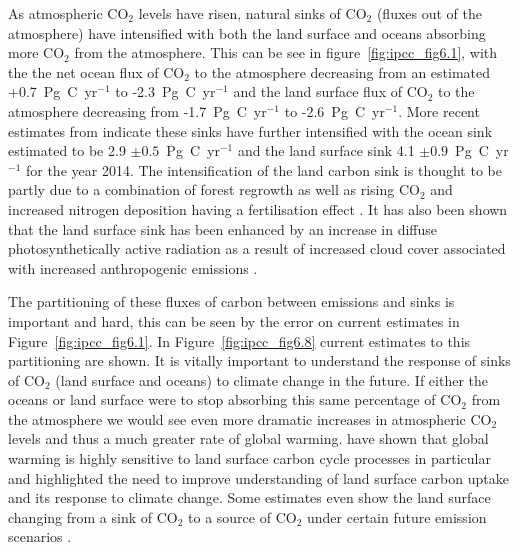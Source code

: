 \documentclass[11pt]{article}
\begin{document}
As atmospheric CO\(_{2}\) levels have risen, natural sinks of CO\(_{2}\) (fluxes out of the atmosphere) have intensified with both the land surface and oceans absorbing more CO\(_{2}\) from the atmosphere. This can be see in figure~\ref{fig:ipcc_fig6.1}, with the the net ocean flux of CO\(_{2}\) to the atmosphere decreasing from an estimated +0.7~Pg~C~yr\(^{-1}\) to -2.3~Pg~C~yr\(^{-1}\) and the land surface flux of CO\(_{2}\) to the atmosphere decreasing from -1.7~Pg~C~yr\(^{-1}\) to -2.6~Pg~C~yr\(^{-1}\). More recent estimates from \citet{le2015global} indicate these sinks have further intensified with the ocean sink estimated to be 2.9 \(\pm 0.5\)~Pg~C~yr\(^{-1}\) and the land surface sink 4.1 \(\pm 0.9\)~Pg~C~yr\(^{-1}\) for the year 2014. The intensification of the land carbon sink is thought to be partly due to a combination of forest regrowth as well as rising CO\(_{2}\) and increased nitrogen deposition having a fertilisation effect \citep{ciais2014carbon}. It has also been shown that the land surface sink has been enhanced by an increase in diffuse photosynthetically active radiation as a result of increased cloud cover associated with increased anthropogenic emissions \citep{Mercadodiffuseradiation2009}. 

The partitioning of these fluxes of carbon between emissions and sinks is important and hard, this can be seen by the error on current estimates in Figure~\ref{fig:ipcc_fig6.1}. In Figure~\ref{fig:ipcc_fig6.8} current estimates to this partitioning are shown. It is vitally important to understand the response of sinks of CO\(_{2}\) (land surface and oceans) to climate change in the future. If either the oceans or land surface were to stop absorbing this same percentage of CO\(_{2}\) from the atmosphere we would see even more dramatic increases in atmospheric CO\(_{2}\) levels and thus a much greater rate of global warming. \citet{1748-9326-7-2-024002} have shown that global warming is highly sensitive to land surface carbon cycle processes in particular and highlighted the need to improve understanding of land surface carbon uptake and its response to climate change. Some estimates even show the land surface changing from a sink of CO\(_{2}\) to a source of CO\(_{2}\) under certain future emission scenarios \citep{sitch2008evaluation, cox2000}.
\end{document}
